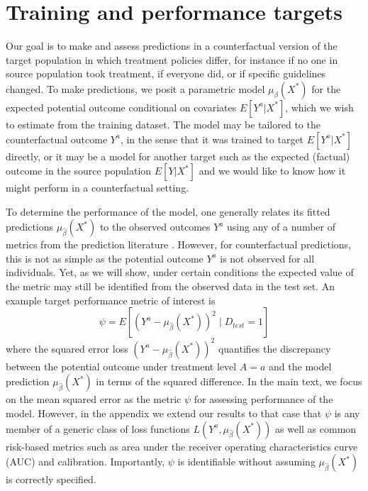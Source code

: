 \section{Training and performance targets} \label{sec:targets}
Our goal is to make and assess predictions in a counterfactual version of the target population in which treatment policies differ, for instance if no one in source population took treatment, if everyone did, or if specific guidelines changed. To make predictions, we posit a parametric model $\mu_{\beta}(X^*)$ for the expected potential outcome conditional on covariates $E[Y^a | X^*]$, which we wish to estimate from the training dataset. The model may be tailored to the counterfactual outcome $Y^a$, in the sense that it was trained to target $E[Y^a | X^*]$ directly, or it may be a model for another target such as the  expected (factual) outcome in the source population $E[Y | X^*]$ and we would like to know how it might perform in a counterfactual setting.

To determine the performance of the model, one generally relates its fitted predictions $\mu_{\widehat{\beta}}(X^*)$ to the observed outcomes $Y^a$ using any of a number of metrics from the prediction literature \cite{harrell_multivariable_1996,steyerberg_clinical_2019,altman_what_2000}. However, for counterfactual predictions, this is not as simple as the potential outcome $Y^a$ is not observed for all individuals. Yet, as we will show, under certain conditions the expected value of the metric may still be identified from the observed data in the test set. An example target performance metric of interest is 
\begin{equation*}
    \psi = E[(Y^a - \mu_{\widehat{\beta}}(X^*))^2 \mid D_{test} = 1]
\end{equation*}
where the squared error loss $(Y^a - \mu_{\widehat{\beta}}(X^*))^2$ quantifies the discrepancy between the potential outcome under treatment level $A = a$ and the model prediction $\mu_{\widehat{\beta}}(X^*)$ in terms of the squared difference. In the main text, we focus on the mean squared error as the metric $\psi$ for assessing performance of the model. However, in the appendix we extend our results to that case that $\psi$ is any member of a generic class of loss functions $L(Y^a,  \mu_{\widehat{\beta}}(X^*))$ as well as common risk-based metrics such as area under the receiver operating characteristics curve (AUC) and calibration. Importantly, $\psi$ is identifiable without assuming $\mu_{\widehat{\beta}}(X^*)$ is correctly specified.

